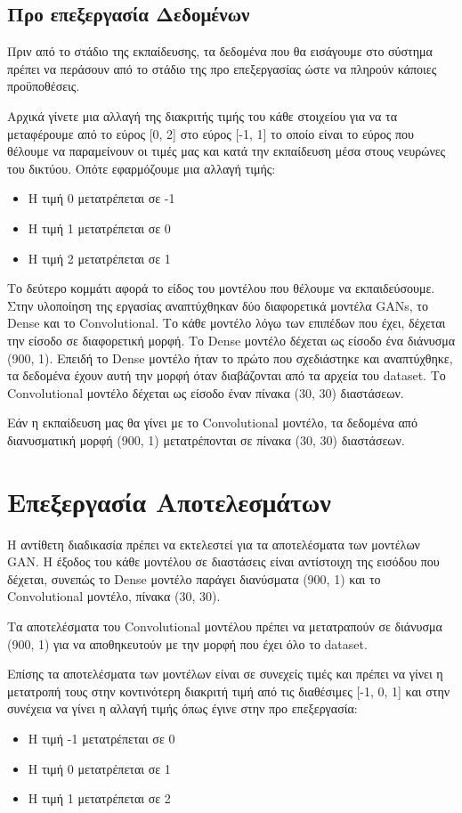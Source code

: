 \subsection{Προ επεξεργασία Δεδομένων}
Πριν από το στάδιο της εκπαίδευσης, τα δεδομένα που θα εισάγουμε στο σύστημα πρέπει να περάσουν από το στάδιο της προ επεξεργασίας ώστε να πληρούν κάποιες προϋποθέσεις.
\par
Αρχικά γίνετε μια αλλαγή της διακριτής τιμής του κάθε στοιχείου για να τα μεταφέρουμε από το εύρος [0, 2] στο εύρος [-1, 1] το οποίο είναι το εύρος που θέλουμε να παραμείνουν οι τιμές μας και κατά την εκπαίδευση μέσα στους νευρώνες του δικτύου. Οπότε εφαρμόζουμε μια αλλαγή τιμής:
\begin{itemize}
\item Η τιμή 0 μετατρέπεται σε -1
\item Η τιμή 1 μετατρέπεται σε 0
\item Η τιμή 2 μετατρέπεται σε 1
\end{itemize}

\par
Το δεύτερο κομμάτι αφορά το είδος του μοντέλου που θέλουμε να εκπαιδεύσουμε. Στην υλοποίηση της εργασίας αναπτύχθηκαν δύο διαφορετικά μοντέλα GANs, το Dense και το Convolutional. Το κάθε μοντέλο λόγω των επιπέδων που έχει, δέχεται την είσοδο σε διαφορετική μορφή. Το Dense μοντέλο δέχεται ως είσοδο ένα διάνυσμα (900, 1). Επειδή το Dense μοντέλο ήταν το πρώτο που σχεδιάστηκε και αναπτύχθηκε, τα δεδομένα έχουν αυτή την μορφή όταν διαβάζονται από τα αρχεία του dataset. Το Convolutional μοντέλο δέχεται ως είσοδο έναν πίνακα (30, 30) διαστάσεων.
\par
Εάν η εκπαίδευση μας θα γίνει με το Convolutional μοντέλο, τα δεδομένα από διανυσματική μορφή (900, 1) μετατρέπονται σε πίνακα (30, 30) διαστάσεων.


\section{Επεξεργασία Αποτελεσμάτων}
Η αντίθετη διαδικασία πρέπει να εκτελεστεί για τα αποτελέσματα των μοντέλων GAN. Η έξοδος του κάθε μοντέλου σε διαστάσεις είναι αντίστοιχη της εισόδου που δέχεται, συνεπώς το Dense μοντέλο παράγει διανύσματα (900, 1) και το Convolutional μοντέλο, πίνακα (30, 30).
\par
Τα αποτελέσματα του Convolutional μοντέλου πρέπει να μετατραπούν σε διάνυσμα (900, 1) για να αποθηκευτούν με την μορφή που έχει όλο το dataset.
\par
Επίσης τα αποτελέσματα των μοντέλων είναι σε συνεχείς τιμές και πρέπει να γίνει η μετατροπή τους στην κοντινότερη διακριτή τιμή από τις διαθέσιμες [-1, 0, 1] και στην συνέχεια να γίνει η αλλαγή τιμής όπως έγινε στην προ επεξεργασία:
\begin{itemize}
\item Η τιμή -1 μετατρέπεται σε 0
\item Η τιμή 0 μετατρέπεται σε 1
\item Η τιμή 1 μετατρέπεται σε 2
\end{itemize}


